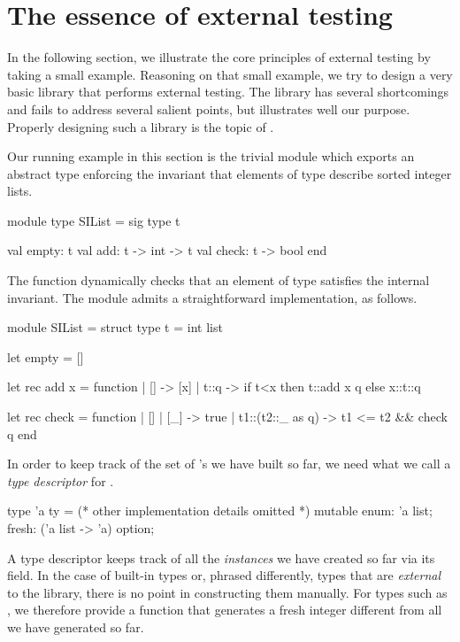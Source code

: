 \section{The essence of external testing}
\label{sec:essence}

In the following section, we illustrate the core principles of external testing
by taking a small example. Reasoning on that small example, we try to design
a very basic library that performs external testing. The library has several
shortcomings and fails to address several salient points, but illustrates well
our purpose. Properly designing such a library is the topic of
.

Our running example in this section is the trivial module which exports an
abstract type  enforcing the invariant that elements of type 
describe sorted integer lists.
%
\begin{ocamlcode}
module type SIList = sig
  type t

  val empty: t
  val add: t -> int -> t
  val check: t -> bool
end
\end{ocamlcode}
%
The  function dynamically checks that an element of type 
satisfies the internal invariant. The module admits a straightforward
implementation, as follows.
%
\begin{ocamlcode}
module SIList = struct
  type t = int list

  let empty = []

  let rec add x = function
    | [] -> [x]
    | t::q -> if t<x then t::add x q else x::t::q

  let rec check = function
    | [] | [_] -> true
    | t1::(t2::_ as q) -> t1 <= t2 && check q
end
\end{ocamlcode}
%
In order to keep track of the set of 's we have built so far, we need
what we call a \emph{type descriptor} for .
%
\begin{ocamlcode}
type 'a ty = {
  (* other implementation details omitted *)
  mutable enum: 'a list;
  fresh: ('a list -> 'a) option;
}
\end{ocamlcode}
%
A type descriptor  keeps track of all the \emph{instances} we have
created so far via its  field. In the case of built-in types or,
phrased differently, types that are \emph{external} to the library, there is no
point in constructing them manually. For types such as , we therefore
provide a  function that generates a fresh integer different from
all we have generated so far.

